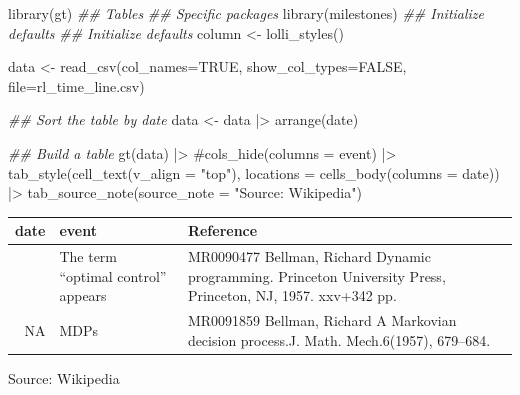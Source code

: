 \documentclass[
  letterpaper,
  DIV=11,
  numbers=noendperiod]{scrreprt}
\newenvironment{Shaded}{\begin{snugshade}}{\end{snugshade}}
\newcommand{\AttributeTok}[1]{\textcolor[rgb]{0.40,0.45,0.13}{#1}}
\newcommand{\CommentTok}[1]{\textcolor[rgb]{0.37,0.37,0.37}{#1}}
\newcommand{\ConstantTok}[1]{\textcolor[rgb]{0.56,0.35,0.01}{#1}}
\newcommand{\DocumentationTok}[1]{\textcolor[rgb]{0.37,0.37,0.37}{\textit{#1}}}
\newcommand{\FunctionTok}[1]{\textcolor[rgb]{0.28,0.35,0.67}{#1}}
\newcommand{\NormalTok}[1]{\textcolor[rgb]{0.00,0.23,0.31}{#1}}
\newcommand{\OtherTok}[1]{\textcolor[rgb]{0.00,0.23,0.31}{#1}}
\newcommand{\SpecialCharTok}[1]{\textcolor[rgb]{0.37,0.37,0.37}{#1}}
\newcommand{\StringTok}[1]{\textcolor[rgb]{0.13,0.47,0.30}{#1}}
\theoremstyle{definition}
\theoremstyle{remark}
\begin{document}
\begin{Shaded}
\begin{Highlighting}[]
\FunctionTok{library}\NormalTok{(gt)        }\DocumentationTok{\#\# Tables}
\DocumentationTok{\#\# Specific packages}
\FunctionTok{library}\NormalTok{(milestones)}
\DocumentationTok{\#\# Initialize defaults}
\DocumentationTok{\#\# Initialize defaults}
\NormalTok{column }\OtherTok{\textless{}{-}} \FunctionTok{lolli\_styles}\NormalTok{()}

\NormalTok{data }\OtherTok{\textless{}{-}} \FunctionTok{read\_csv}\NormalTok{(}\AttributeTok{col\_names=}\ConstantTok{TRUE}\NormalTok{, }\AttributeTok{show\_col\_types=}\ConstantTok{FALSE}\NormalTok{, }\AttributeTok{file=}\StringTok{\textquotesingle{}rl\_time\_line.csv\textquotesingle{}}\NormalTok{)}

\DocumentationTok{\#\# Sort the table by date}
\NormalTok{data }\OtherTok{\textless{}{-}}\NormalTok{ data }\SpecialCharTok{|\textgreater{}}
  \FunctionTok{arrange}\NormalTok{(date)}

\DocumentationTok{\#\# Build a table}
\FunctionTok{gt}\NormalTok{(data) }\SpecialCharTok{|\textgreater{}}
  \CommentTok{\#cols\_hide(columns = event) |\textgreater{}}
  \FunctionTok{tab\_style}\NormalTok{(}\FunctionTok{cell\_text}\NormalTok{(}\AttributeTok{v\_align =} \StringTok{"top"}\NormalTok{),}
            \AttributeTok{locations =} \FunctionTok{cells\_body}\NormalTok{(}\AttributeTok{columns =}\NormalTok{ date)) }\SpecialCharTok{|\textgreater{}}
  \FunctionTok{tab\_source\_note}\NormalTok{(}\AttributeTok{source\_note =} \StringTok{"Source: Wikipedia"}\NormalTok{) }
\end{Highlighting}
\end{Shaded}

\begingroup
\fontsize{12.0pt}{14.4pt}\selectfont
\setlength{\LTpost}{0mm}
\begin{longtable*}{rll}
\toprule
date & event & Reference \\ 
\midrule{} & The term  “optimal control” appears & MR0090477 Bellman, Richard Dynamic programming. Princeton University Press, Princeton, NJ, 1957. xxv+342 pp. \\ 
{NA} & MDPs & MR0091859 Bellman, Richard A Markovian decision process.J. Math. Mech.6(1957), 679–684. \\ 
\bottomrule
\end{longtable*}
\begin{minipage}{\linewidth}
Source: Wikipedia\\
\end{minipage}
\endgroup
\end{document}
